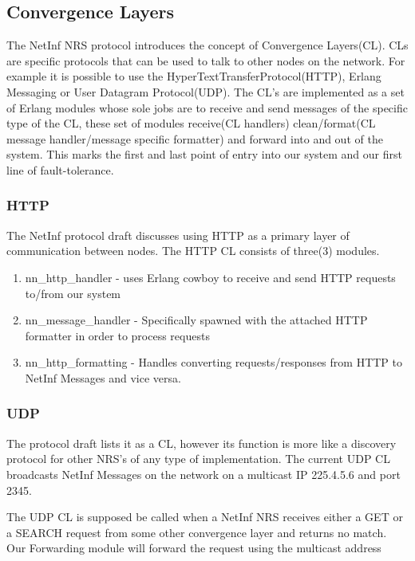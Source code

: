 \subsection {Convergence Layers}

The NetInf NRS protocol introduces the concept of Convergence Layers(CL). CLs are specific protocols that can be used to talk to other nodes on the network. For example it is possible to use the HyperTextTransferProtocol(HTTP), Erlang Messaging or User Datagram Protocol(UDP). The CL's are implemented as a set of Erlang modules whose sole jobs are to receive and send messages of the specific type of the CL, these set of modules  receive(CL handlers) clean/format(CL message handler/message specific formatter) and forward into and out of the system. This marks the first and last point of entry into our system and our first line of fault-tolerance. 

\subsubsection{HTTP}

The NetInf protocol draft discusses using HTTP as a primary layer of communication between nodes. The HTTP CL consists of three(3) modules. 

\begin{enumerate}
\item nn\_http\_handler - uses Erlang cowboy to receive and send HTTP requests to/from our system
\item nn\_message\_handler - Specifically spawned with the attached HTTP formatter in order to process requests
\item nn\_http\_formatting - Handles converting requests/responses from HTTP  to NetInf Messages and vice versa.
\end{enumerate}


\subsubsection{UDP}

The protocol draft lists it as a CL, however its function is more like a discovery protocol for other NRS's of any type of implementation. The current UDP CL broadcasts NetInf Messages on the network on a multicast IP 225.4.5.6 and port 2345. 

The UDP CL is supposed be called when a NetInf NRS receives either a GET or a SEARCH request from some other convergence layer and returns no match. Our Forwarding module will forward the request using the multicast address

